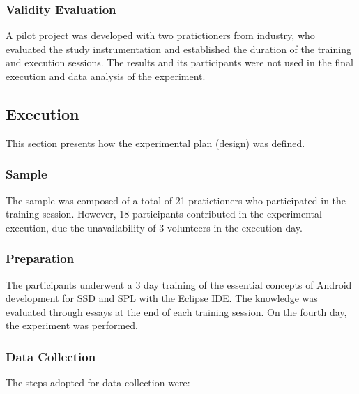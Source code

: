 \subsubsection{Validity Evaluation}

A pilot project was developed with two pratictioners from industry, who evaluated the study instrumentation and established the duration of the training and execution sessions. The results and its participants were not used in the final execution and data analysis of the experiment.

\subsection{Execution}\label{sub:execution}

This section presents how the experimental plan (design) was defined.

\subsubsection{Sample}

The sample was composed of a total of 21 pratictioners who participated in the training session. However, 18 participants contributed in the experimental execution, due the unavailability of 3 volunteers in the execution day.

\subsubsection{Preparation}

The participants underwent a 3 day training of the essential concepts of Android development for SSD and SPL with the Eclipse IDE. The knowledge was evaluated through essays at the end of each training session. On the fourth day, the experiment was performed.

\subsubsection{Data Collection}

The steps adopted for data collection were:

